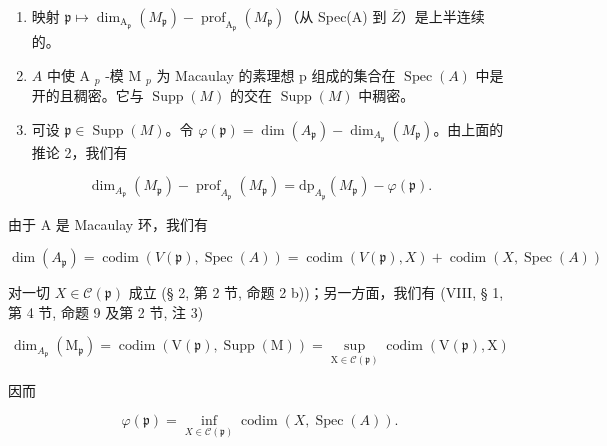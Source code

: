 \begin{enumerate}
\def\labelenumi{\alph{enumi})}
\setcounter{enumi}{1}
\item
  映射 \(\mathfrak{p}\mapsto\dim_{\mathrm{A}_{\mathfrak{p}}}(M_{\mathfrak{p}})-\operatorname{prof}_{\mathrm{A}_{\mathfrak{p}}}(M_{\mathfrak{p}})\)（从 Spec(A) 到 \(\overline{Z}\)）是上半连续的。
\item
  \(A\) 中使 A \(_{p}\) -模 M \(_{p}\) 为 Macaulay 的素理想 p 组成的集合在 \(\operatorname{Spec}(A)\) 中是开的且稠密。它与 \(\operatorname{Supp}(M)\) 的交在 \(\operatorname{Supp}(M)\) 中稠密。
\item
  可设 \(\mathfrak{p} \in \operatorname{Supp}(M)\)。令 \(\varphi(\mathfrak{p}) = \dim(A_{\mathfrak{p}}) - \dim_{A_{\mathfrak{p}}}(M_{\mathfrak{p}})\)。由上面的推论 2，我们有
\end{enumerate}

\[
\dim_ {A _ {\mathfrak {p}}} (M _ {\mathfrak {p}}) - \operatorname{prof} _ {A _ {\mathfrak {p}}} (M _ {\mathfrak {p}}) = \mathrm{dp} _ {A _ {\mathfrak {p}}} (M _ {\mathfrak {p}}) - \varphi (\mathfrak {p}).
\]

由于 A 是 Macaulay 环，我们有

\[
\dim (A _ {\mathfrak {p}}) = \operatorname{codim} (V (\mathfrak {p}), \operatorname{Spec} (A)) = \operatorname{codim} (V (\mathfrak {p}), X) + \operatorname{codim} (X, \operatorname{Spec} (A))
\]

对一切 \(X \in \mathcal{C}(\mathfrak{p})\) 成立 (§ 2, 第 2 节, 命题 2 b))；另一方面，我们有 (VIII, § 1, 第 4 节, 命题 9 及第 2 节, 注 3)

\[
\dim_ {A_ {\mathfrak {p}}} \left(\mathrm{M} _ {\mathfrak {p}}\right) = \operatorname{codim} (\mathrm{V} (\mathfrak {p}), \operatorname{Supp} (\mathrm{M})) = \sup _ {\mathrm{X} \in \mathscr {C} (\mathfrak {p})} \operatorname{codim} (\mathrm{V} (\mathfrak {p}), \mathrm{X})
\]

因而

\[
\varphi (\mathfrak {p}) = \inf _ {X \in \mathscr {C} (\mathfrak {p})} \operatorname{codim} (X, \operatorname{Spec} (A)).
\]

